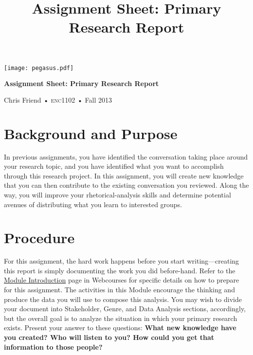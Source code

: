 \documentclass[10pt,oneside]{amsart}	%
\title[Primary Research Report]{Assignment Sheet: Primary Research Report}
\begin{document}
%
\thispagestyle{empty}

\vspace{-2in}
\begin{center}
\huge
\texttt{[image: pegasus.pdf]}

\textbf{Assignment Sheet: Primary Research Report}

{\normalsize Chris Friend • \textsc{enc1102} • Fall 2013}
\end{center}
\vspace{1.5\baselineskip}

\section{Background and Purpose} %
\label{sec:background}
In previous assignments, you have identified the conversation taking place around your research topic, and you have identified what you want to accomplish through this research project. In this assignment, you will create new knowledge that you can then contribute to the existing conversation you reviewed. Along the way, you will improve your rhetorical-analysis skills and determine potential avenues of distributing what you learn to interested groups.

\section{Procedure} %
\label{sec:procedure}
For this assignment, the hard work happens before you start writing---creating this report is simply documenting the work you did before-hand. Refer to the \href{https://webcourses.ucf.edu/courses/982699/wiki/primary-research-module-4-intro}{Module Introduction} page in Webcourses for specific details on how to prepare for this assignment. The activities in this Module encourage the thinking and produce the data you will use to compose this analysis. You may wish to divide your document into Stakeholder, Genre, and Data Analysis sections, accordingly, but the overall goal is to analyze the situation in which your primary research exists. Present your answer to these questions: \textbf{What new knowledge have you created? Who will listen to you? How could you get that information to those people?}
\end{document}
